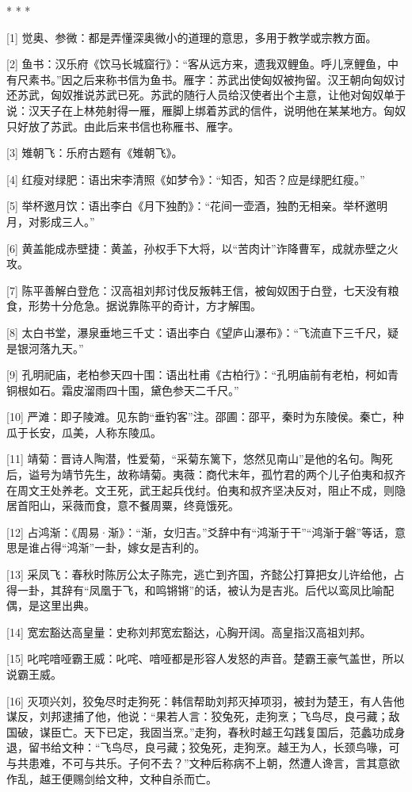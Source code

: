 \documentclass[12pt,UTF8]{ctexbook}
\begin{document}
* * *



[1] 觉奥、参微：都是弄懂深奥微小的道理的意思，多用于教学或宗教方面。

[2] 鱼书：汉乐府《饮马长城窟行》：“客从远方来，遗我双鲤鱼。呼儿烹鲤鱼，中有尺素书。”因之后来称书信为鱼书。雁字：苏武出使匈奴被拘留。汉王朝向匈奴讨还苏武，匈奴推说苏武已死。苏武的随行人员给汉使者出个主意，让他对匈奴单于说：汉天子在上林苑射得一雁，雁脚上绑着苏武的信件，说明他在某某地方。匈奴只好放了苏武。由此后来书信也称雁书、雁字。

[3] 雉朝飞：乐府古题有《雉朝飞》。

[4] 红瘦对绿肥：语出宋李清照《如梦令》：“知否，知否？应是绿肥红瘦。”

[5] 举杯邀月饮：语出李白《月下独酌》：“花间一壶酒，独酌无相亲。举杯邀明月，对影成三人。”

[6] 黄盖能成赤壁捷：黄盖，孙权手下大将，以“苦肉计”诈降曹军，成就赤壁之火攻。

[7] 陈平善解白登危：汉高祖刘邦讨伐反叛韩王信，被匈奴困于白登，七天没有粮食，形势十分危急。据说靠陈平的奇计，方才解围。

[8] 太白书堂，瀑泉垂地三千丈：语出李白《望庐山瀑布》：“飞流直下三千尺，疑是银河落九天。”

[9] 孔明祀庙，老柏参天四十围：语出杜甫《古柏行》：“孔明庙前有老柏，柯如青铜根如石。霜皮溜雨四十围，黛色参天二千尺。”

[10] 严滩：即子陵滩。见东韵“垂钓客”注。邵圃：邵平，秦时为东陵侯。秦亡，种瓜于长安，瓜美，人称东陵瓜。

[11] 靖菊：晋诗人陶潜，性爱菊，“采菊东篱下，悠然见南山”是他的名句。陶死后，谥号为靖节先生，故称靖菊。夷薇：商代末年，孤竹君的两个儿子伯夷和叔齐在周文王处养老。文王死，武王起兵伐纣。伯夷和叔齐坚决反对，阻止不成，则隐居首阳山，采薇而食，意不餐周粟，终竟饿死。

[12] 占鸿渐：《周易·渐》：“渐，女归吉。”爻辞中有“鸿渐于干”“鸿渐于磐”等话，意思是谁占得“鸿渐”一卦，嫁女是吉利的。

[13] 采凤飞：春秋时陈厉公太子陈完，逃亡到齐国，齐懿公打算把女儿许给他，占得一卦，其辞有“凤凰于飞，和鸣锵锵”的话，被认为是吉兆。后代以鸾凤比喻配偶，是这里出典。

[14] 宽宏豁达高皇量：史称刘邦宽宏豁达，心胸开阔。高皇指汉高祖刘邦。

[15] 叱咤喑哑霸王威：叱咤、喑哑都是形容人发怒的声音。楚霸王豪气盖世，所以说霸王威。

[16] 灭项兴刘，狡兔尽时走狗死：韩信帮助刘邦灭掉项羽，被封为楚王，有人告他谋反，刘邦逮捕了他，他说：“果若人言：狡兔死，走狗烹；飞鸟尽，良弓藏；敌国破，谋臣亡。天下已定，我固当烹。”走狗，春秋时越王勾践复国后，范蠡功成身退，留书给文种：“飞鸟尽，良弓藏；狡兔死，走狗烹。越王为人，长颈鸟喙，可与共患难，不可与共乐。子何不去？”文种后称病不上朝，然遭人谗言，言其意欲作乱，越王便赐剑给文种，文种自杀而亡。
\end{document}

